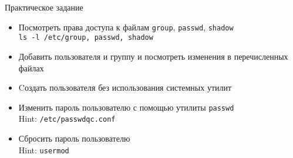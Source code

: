 \begin{frame}{Практическое задание}
    \begin{itemize}
		\item Посмотреть права доступа к файлам {\tt group}, {\tt passwd}, {\tt shadow}\\
			{\tt ls -l /etc/{group, passwd, shadow}}
		\item Добавить пользователя и группу и посмотреть изменения в перечисленных файлах
		\item Cоздать пользователя без использования системных утилит
    \end{itemize}
	\pause
	 \begin{itemize}
		\item Изменить пароль пользователю с помощью утилиты {\tt passwd}\\
			Hint: {\tt /etc/passwdqc.conf}
		\item Сбросить пароль пользователю\\
			Hint: {\tt usermod}
    \end{itemize}
\end{frame}


